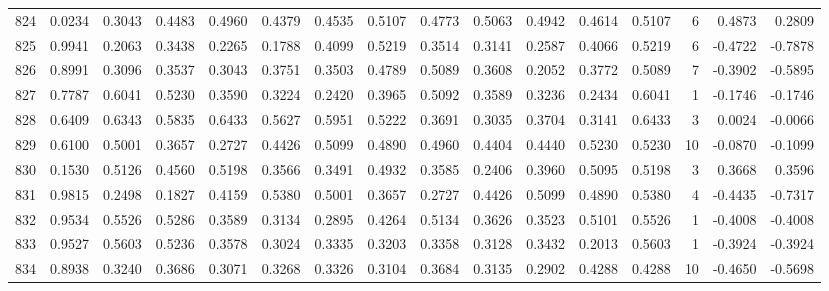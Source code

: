 \begin{tabular}{lrrrrrrrrrrrrrrr}
824 &      0.0234 &  0.3043 &  0.4483 &  0.4960 &  0.4379 &  0.4535 &  0.5107 &  0.4773 &  0.5063 &  0.4942 &   0.4614 &     0.5107 &      6 &                    0.4873 &                     0.2809 \\
825 &      0.9941 &  0.2063 &  0.3438 &  0.2265 &  0.1788 &  0.4099 &  0.5219 &  0.3514 &  0.3141 &  0.2587 &   0.4066 &     0.5219 &      6 &                   -0.4722 &                    -0.7878 \\
826 &      0.8991 &  0.3096 &  0.3537 &  0.3043 &  0.3751 &  0.3503 &  0.4789 &  0.5089 &  0.3608 &  0.2052 &   0.3772 &     0.5089 &      7 &                   -0.3902 &                    -0.5895 \\
827 &      0.7787 &  0.6041 &  0.5230 &  0.3590 &  0.3224 &  0.2420 &  0.3965 &  0.5092 &  0.3589 &  0.3236 &   0.2434 &     0.6041 &      1 &                   -0.1746 &                    -0.1746 \\
828 &      0.6409 &  0.6343 &  0.5835 &  0.6433 &  0.5627 &  0.5951 &  0.5222 &  0.3691 &  0.3035 &  0.3704 &   0.3141 &     0.6433 &      3 &                    0.0024 &                    -0.0066 \\
829 &      0.6100 &  0.5001 &  0.3657 &  0.2727 &  0.4426 &  0.5099 &  0.4890 &  0.4960 &  0.4404 &  0.4440 &   0.5230 &     0.5230 &     10 &                   -0.0870 &                    -0.1099 \\
830 &      0.1530 &  0.5126 &  0.4560 &  0.5198 &  0.3566 &  0.3491 &  0.4932 &  0.3585 &  0.2406 &  0.3960 &   0.5095 &     0.5198 &      3 &                    0.3668 &                     0.3596 \\
831 &      0.9815 &  0.2498 &  0.1827 &  0.4159 &  0.5380 &  0.5001 &  0.3657 &  0.2727 &  0.4426 &  0.5099 &   0.4890 &     0.5380 &      4 &                   -0.4435 &                    -0.7317 \\
832 &      0.9534 &  0.5526 &  0.5286 &  0.3589 &  0.3134 &  0.2895 &  0.4264 &  0.5134 &  0.3626 &  0.3523 &   0.5101 &     0.5526 &      1 &                   -0.4008 &                    -0.4008 \\
833 &      0.9527 &  0.5603 &  0.5236 &  0.3578 &  0.3024 &  0.3335 &  0.3203 &  0.3358 &  0.3128 &  0.3432 &   0.2013 &     0.5603 &      1 &                   -0.3924 &                    -0.3924 \\
834 &      0.8938 &  0.3240 &  0.3686 &  0.3071 &  0.3268 &  0.3326 &  0.3104 &  0.3684 &  0.3135 &  0.2902 &   0.4288 &     0.4288 &     10 &                   -0.4650 &                    -0.5698 \\

\end{tabular}
